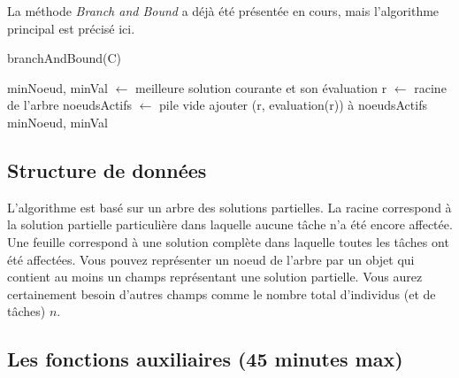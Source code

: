 \documentclass[a4paper,francais]{article}
\theoremstyle{definition}
\begin{document}
La méthode \emph{Branch and Bound} a déjà été présentée en cours,
mais l'algorithme principal est précisé ici. 

  \begin{algorithm}[H]
    \caption{branchAndBound(C)}
    \label{alg:bb}
    minNoeud, minVal $\leftarrow$ meilleure solution courante et son évaluation \;
    r $\leftarrow$ racine de l'arbre \;
    noeudsActifs $\leftarrow$ pile vide \;
    ajouter (r, evaluation(r)) à noeudsActifs \; 
    \Return minNoeud, minVal
  \end{algorithm}

\subsection{Structure de données}

L'algorithme est basé sur un arbre des solutions partielles. La racine
correspond à la solution partielle particulière dans laquelle aucune tâche
n'a été encore affectée. Une feuille correspond à une solution complète
dans laquelle toutes les tâches ont été affectées. 
Vous pouvez représenter un noeud de l'arbre par un objet qui contient
au moins un champs représentant une solution partielle. Vous aurez certainement
besoin d'autres champs comme le nombre total d'individus (et de tâches) $n$. 

\subsection{Les fonctions auxiliaires (45 minutes max)}
\end{document}
